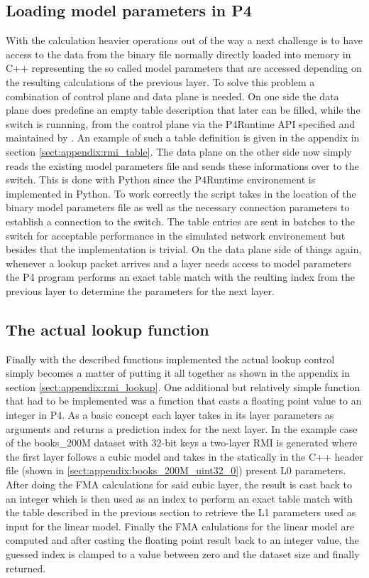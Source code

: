 \subsection{Loading model parameters in P4}
With the calculation heavier operations out of the way a next challenge is to have access to the data from the binary file normally directly loaded into memory in C++ representing the so called model parameters that are accessed depending on the resulting calculations of the previous layer. To solve this problem a combination of control plane and data plane is needed. On one side the data plane does predefine an empty table description that later can be filled, while the switch is runnning, from the control plane via the P4Runtime API specified and maintained by \cite{p4runtime-spec}. An example of such a table definition is given in the appendix in section \ref{sect:appendix:rmi_table}. The data plane on the other side now simply reads the existing model parameters file and sends these informations over to the switch. This is done with Python since the P4Runtime environement is implemented in Python. To work correctly the script takes in the location of the binary model parameters file as well as the necessary connection parameters to establish a connection to the switch. The table entries are sent in batches to the switch for acceptable performance in the simulated network environement but besides that the implementation is trivial. On the data plane side of things again, whenever a lookup packet arrives and a layer needs access to model parameters the P4 program performs an exact table match with the reulting index from the previous layer to determine the parameters for the next layer.

\subsection{The actual lookup function}
Finally with the described functions implemented the actual lookup control simply becomes a matter of putting it all together as shown in the appendix in section \ref{sect:appendix:rmi_lookup}. One additional but relatively simple function that had to be implemented was a function that casts a floating point value to an integer in P4. As a basic concept each layer takes in its layer parameters as arguments and returns a prediction index for the next layer. In the example case of the books\_200M dataset with 32-bit keys a two-layer RMI is generated where the first layer follows a cubic model and takes in the statically in the C++ header file (shown in \ref{sect:appendix:books_200M_uint32_0}) present L0 parameters. After doing the FMA calculations for said cubic layer, the result is cast back to an integer which is then used as an index to perform an exact table match with the table described in the previous section to retrieve the L1 parameters used as input for the linear model. Finally the FMA calulations for the linear model are computed and after casting the floating point result back to an integer value, the guessed index is clamped to a value between zero and the dataset size and finally returned.

